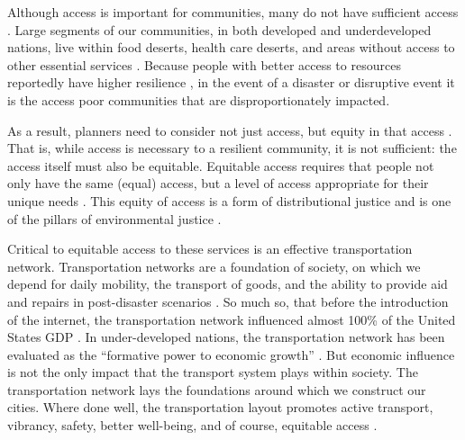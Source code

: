 \documentclass[review,3p,times,onecolumn,sort&compress,12pt]{elsarticle}
\let \cite \parencite
\begin{document}
Although access is important for communities, many do not have sufficient access \cite{Logan2021-ineq}.
Large segments of our communities, in both developed and underdeveloped nations, live within food deserts, health care deserts, and areas without access to other essential services \cite{Beaulac2009-sf}.
Because people with better access to resources reportedly have higher resilience \cite{Frazier2013-wd}, in the event of a disaster or disruptive event it is the access poor communities that are disproportionately impacted.

As a result, planners need to consider not just access, but equity in that access \cite{Dempsey2011-sv, logan2020reframing}.
That is, while access is necessary to a resilient community, it is not sufficient: the access itself must also be equitable.
Equitable access requires that people not only have the same (equal) access, but a level of access appropriate for their unique needs \cite{Lucy1977-dt, Talen1998-mk}.
This equity of access is a form of distributional justice and is one of the pillars of environmental justice \cite{Low2013-yx, McDermott2013-wl}.

Critical to equitable access to these services is an effective transportation network.
Transportation networks are a foundation of society, on which we depend for daily mobility, the transport of goods, and the ability to provide aid and repairs in post-disaster scenarios \cite{Mattsson2015-mg, Dalziell2001-un}.
So much so, that before the introduction of the internet, the transportation network influenced almost 100\% of the United States GDP \cite{Han2000-rn}.
In under-developed nations, the transportation network has been evaluated as the ``formative power to economic growth'' \cite{Hoyle1973-ms}.
But economic influence is not the only impact that the transport system plays within society.
The transportation network lays the foundations around which we construct our cities.
Where done well, the transportation layout promotes active transport, vibrancy, safety, better well-being, and of course, equitable access \cite{Jacobs2016-ks}.
\end{document}
